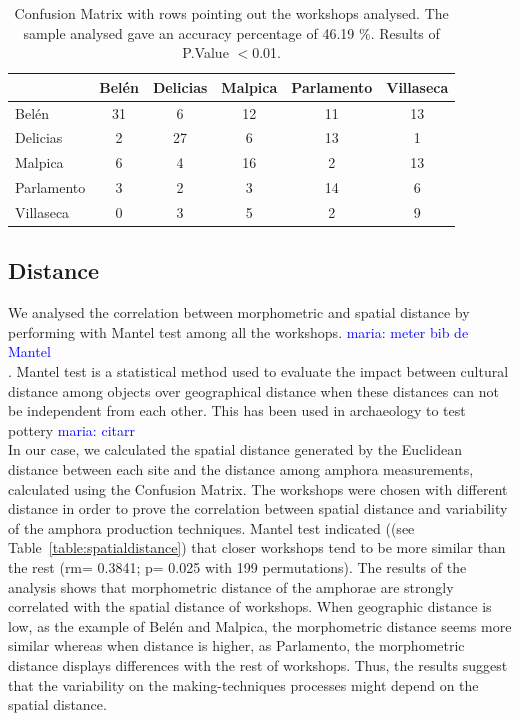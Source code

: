 \documentclass[review]{elsarticle}
\newcommand{\memo}[2]{\textcolor{#1}{#2}}
\newcommand{\maria}[1]{\memo{blue}{maria: #1\\}}
\begin{document}
\begin{table}[htp]
\begin{tabular}{lccccc}
\hline
      & Bel\'en & Delicias & Malpica & Parlamento & Villaseca\\ \hline
Bel\'en &   31  &      6   &   12    &     11     &   13 \\
Delicias&  2  &     27   &    6    &     13     &    1  \\
Malpica &  6  &      4   &   16    &      2     &   13   \\
Parlamento & 3&      2   &   3     &      14    &    6    \\
Villaseca  & 0&      3   &    5    &      2     &    9     \\
\hline

\end{tabular}
\caption{Confusion Matrix with rows pointing out the workshops analysed. The sample analysed gave an accuracy percentage of 46.19 $\%$. Results of P.Value $<$0.01. }
\label{table:confusion}
\end{table}

\subsection{Distance}

We analysed the correlation between morphometric and spatial distance by performing with Mantel test among all the workshops. \maria{meter bib de Mantel}. Mantel test is a statistical method used to evaluate the impact between cultural distance among objects over geographical distance when these distances can not be independent from each other. 
This has been used in archaeology to test pottery \maria{citarr} In our case, we calculated the spatial distance generated by the Euclidean distance between each site and the distance among amphora measurements, calculated using the Confusion Matrix. The workshops were chosen with different distance in order to prove the correlation between spatial distance and variability of the amphora production techniques. Mantel test indicated ((see Table~\ref{table:spatialdistance}) that closer workshops tend to be more similar than the rest (rm= 0.3841; p= 0.025 with 199 permutations). The results of the analysis shows that morphometric distance of the amphorae are strongly correlated with the spatial distance of workshops. When geographic distance is low, as the example of Bel\'en and Malpica, the morphometric distance seems more similar whereas when distance is higher, as Parlamento, the morphometric distance displays differences with the rest of workshops. Thus, the results suggest that the variability on the making-techniques processes might depend on the spatial distance.   
\end{document}
